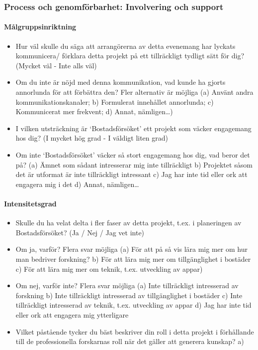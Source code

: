 \documentclass[]{tufte-handout}
\providecommand{\tightlist}{%
  \setlength{\itemsep}{0pt}\setlength{\parskip}{0pt}}
\begin{document}
\hypertarget{process-och-genomfuxf6rbarhet-involvering-och-support}{%
\subsubsection{Process och genomförbarhet: Involvering och
support}\label{process-och-genomfuxf6rbarhet-involvering-och-support}}

\hypertarget{muxe5lgruppsinriktning}{%
\paragraph{Målgruppsinriktning}\label{muxe5lgruppsinriktning}}

\begin{itemize}
\tightlist
\item
  Hur väl skulle du säga att arrangörerna av detta evenemang har lyckats
  kommunicera/ förklara detta projekt på ett tillräckligt tydligt sätt
  för dig? (Mycket väl - Inte alls väl)
\item
  Om du inte är nöjd med denna kommunikation, vad kunde ha gjorts
  annorlunda för att förbättra den? Fler alternativ är möjliga (a)
  Använt andra kommunikationskanaler; b) Formulerat innehållet
  annorlunda; c) Kommunicerat mer frekvent; d) Annat, nämligen\ldots)
\item
  I vilken utsträckning är `Bostadsförsöket' ett projekt som väcker
  engagemang hos dig? (I mycket hög grad - I väldigt liten grad)
\item
  Om inte `Bostadsförsöket' väcker så stort engagemang hos dig, vad
  beror det på? (a) Ämnet som sådant intresserar mig inte tillräckligt
  b) Projektet såsom det är utformat är inte tillräckligt intressant c)
  Jag har inte tid eller ork att engagera mig i det d) Annat,
  nämligen\ldots{}
\end{itemize}

\hypertarget{intensitetsgrad}{%
\paragraph{Intensitetsgrad}\label{intensitetsgrad}}

\begin{itemize}
\tightlist
\item
  Skulle du ha velat delta i fler faser av detta projekt, t.ex. i
  planeringen av Bostadsförsöket? (Ja / Nej / Jag vet inte)
\item
  Om ja, varför? Flera svar möjliga (a) För att på så vis lära mig mer
  om hur man bedriver forskning? b) För att lära mig mer om
  tillgänglighet i bostäder c) För att lära mig mer om teknik, t.ex.
  utveckling av appar)
\item
  Om nej, varför inte? Flera svar möjliga (a) Inte tillräckligt
  intresserad av forskning b) Inte tillräckligt intresserad av
  tillgänglighet i bostäder c) Inte tillräckligt intresserad av teknik,
  t.ex. utveckling av appar d) Jag har inte tid eller ork att engagera
  mig ytterligare
\item
  Vilket påstående tycker du bäst beskriver din roll i detta projekt i
  förhållande till de professionella forskarnas roll när det gäller att
  generera kunskap? a)
\end{itemize}
\end{document}
